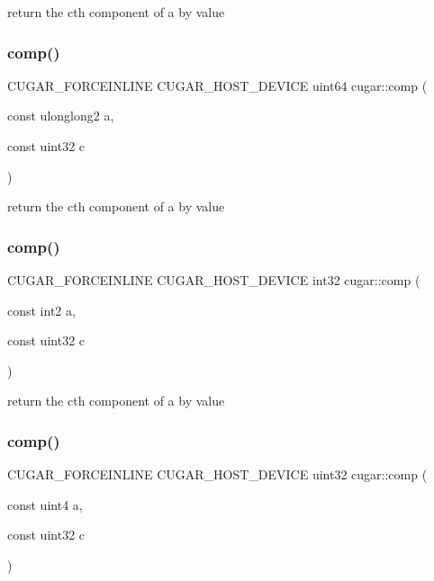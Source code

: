 return the c\textquotesingle{}th component of a by value \mbox{\label{group___basic_ga82749940d0c34c292e2761ecf2c3f1e3}} 
\subsubsection{\texorpdfstring{comp()}{comp()}\hspace{0.1cm}{\footnotesize\ttfamily [6/11]}}
{\footnotesize\ttfamily C\+U\+G\+A\+R\+\_\+\+F\+O\+R\+C\+E\+I\+N\+L\+I\+NE C\+U\+G\+A\+R\+\_\+\+H\+O\+S\+T\+\_\+\+D\+E\+V\+I\+CE uint64 cugar\+::comp (\begin{DoxyParamCaption}\item[{const ulonglong2}]{a,  }\item[{const uint32}]{c }\end{DoxyParamCaption})}

return the c\textquotesingle{}th component of a by value \mbox{\label{group___basic_gab9628292c5eb84f4597f8e345b79cba2}} 
\subsubsection{\texorpdfstring{comp()}{comp()}\hspace{0.1cm}{\footnotesize\ttfamily [7/11]}}
{\footnotesize\ttfamily C\+U\+G\+A\+R\+\_\+\+F\+O\+R\+C\+E\+I\+N\+L\+I\+NE C\+U\+G\+A\+R\+\_\+\+H\+O\+S\+T\+\_\+\+D\+E\+V\+I\+CE int32 cugar\+::comp (\begin{DoxyParamCaption}\item[{const int2}]{a,  }\item[{const uint32}]{c }\end{DoxyParamCaption})}

return the c\textquotesingle{}th component of a by value \mbox{\label{group___basic_ga5545f19d89c4e61611468d6bd1060a0f}} 
\subsubsection{\texorpdfstring{comp()}{comp()}\hspace{0.1cm}{\footnotesize\ttfamily [8/11]}}
{\footnotesize\ttfamily C\+U\+G\+A\+R\+\_\+\+F\+O\+R\+C\+E\+I\+N\+L\+I\+NE C\+U\+G\+A\+R\+\_\+\+H\+O\+S\+T\+\_\+\+D\+E\+V\+I\+CE uint32 cugar\+::comp (\begin{DoxyParamCaption}\item[{const uint4}]{a,  }\item[{const uint32}]{c }\end{DoxyParamCaption})}


